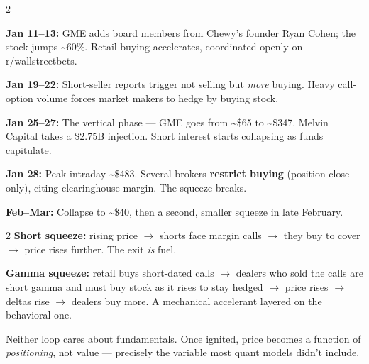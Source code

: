 \documentclass{pyportfolios-note}
\begin{document}
\begin{multicols}{2}
\begin{notebullets}
\item \textbf{Jan 11–13:} GME adds board members from Chewy's founder Ryan
      Cohen; the stock jumps \textasciitilde60\%. Retail buying accelerates,
      coordinated openly on r/wallstreetbets.
\item \textbf{Jan 19–22:} Short-seller reports trigger not selling but
      \textit{more} buying. Heavy call-option volume forces market makers to
      hedge by buying stock.
\item \textbf{Jan 25–27:} The vertical phase — GME goes from
      \textasciitilde\$65 to \textasciitilde\$347. Melvin Capital takes a
      \$2.75B injection. Short interest starts collapsing as funds capitulate.
\item \textbf{Jan 28:} Peak intraday \textasciitilde\$483. Several brokers
      \textbf{restrict buying} (position-close-only), citing clearinghouse
      margin. The squeeze breaks.
\item \textbf{Feb–Mar:} Collapse to \textasciitilde\$40, then a second, smaller
      squeeze in late February.
\end{notebullets}
\end{multicols}

\noteneedroom{170bp}

\begin{multicols}{2}
\textbf{Short squeeze:} rising price $\rightarrow$ shorts face margin calls
$\rightarrow$ they buy to cover $\rightarrow$ price rises further. The exit
\textit{is} fuel.

\textbf{Gamma squeeze:} retail buys short-dated calls $\rightarrow$ dealers who
sold the calls are short gamma and must buy stock as it rises to stay hedged
$\rightarrow$ price rises $\rightarrow$ deltas rise $\rightarrow$ dealers buy
more. A mechanical accelerant layered on the behavioral one.

Neither loop cares about fundamentals. Once ignited, price becomes a function of
\textit{positioning}, not value — precisely the variable most quant models
didn't include.
\end{multicols}

\noteneedroom{150bp}
\end{document}

